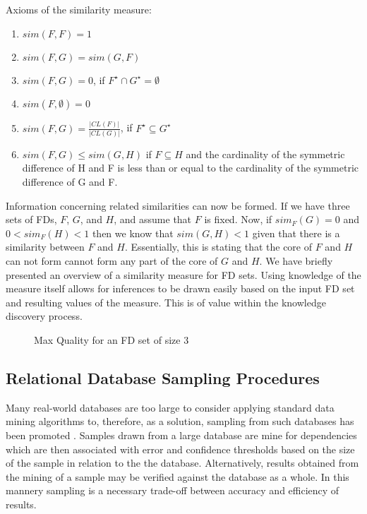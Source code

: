 Axioms of the similarity measure:
\begin{enumerate}
\item $sim(F, F) = 1$
\item $sim(F, G) = sim(G, F)$
\item $sim(F, G) = 0$, if $F^\star \cap G^\star = \emptyset$
\item $sim(F, \emptyset) = 0$
\item $sim(F, G) = \frac{|CL(F)|}{ |CL(G)|}$, if $F^\star \subseteq G^\star$
\item  $sim(F,G) \le sim(G,H)$ if $F \subseteq H$ and
the cardinality of the symmetric difference of H and F is less than or
equal to the cardinality of the symmetric difference of G and F. 
\end{enumerate}
Information concerning related similarities can now be formed.  If we
have three sets of FDs, $F$, $G$, and $H$, and assume that $F$ is
fixed. Now, if $sim_F(G) = 0$ and $0 < sim_F(H) < 1$ then we know
that $sim(G,H) < 1$ given that there is a similarity between $F$ and
$H$. Essentially, this is stating that the core of $F$ and $H$ can not
form cannot form any part of the core of $G$ and $H$. We have briefly
presented an overview of a similarity measure for FD sets. Using
knowledge of the measure itself allows for inferences to be drawn
easily based on the input FD set and resulting values of the
measure. This is of value within the knowledge discovery process.

\begin{figure}
\centerline{}
\caption{\label{graph:simquality}\scriptsize{Max Quality for an FD set of size 3}}
\end{figure}



\subsection{Relational Database Sampling Procedures}\label{subsec:dat_samp}

Many real-world databases are too large to consider applying standard
data mining algorithms to, therefore, as a solution, sampling from
such databases has been promoted \cite{km94,toi96b}. Samples drawn
from a large database are mine for dependencies which are then
associated with error and confidence thresholds based on the size of
the sample in relation to the the database. Alternatively, results
obtained from the mining of a sample may be verified against the
database as a whole. In this mannery sampling is a necessary trade-off
between accuracy and efficiency of results.


